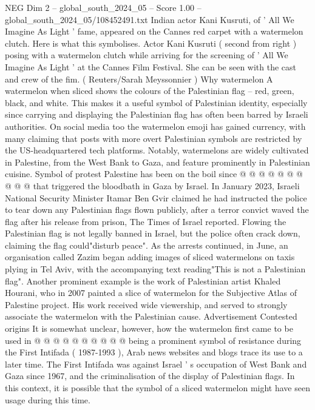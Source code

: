 \begin{textsample}{NEG Dim 2 – global\_south\_2024\_05 – Score 1.00 – global\_south\_2024\_05/108452491.txt}  \label{ex:f2_neg_375}
Indian actor Kani Kusruti, of ' All We Imagine As Light ' fame, appeared on the Cannes red carpet with a watermelon clutch.
Here is what this symbolises.
Actor Kani Kusruti ( second from right ) posing with a watermelon clutch while arriving for the screening of ' All We Imagine As Light ' at the Cannes Film Festival.
She can be seen with the cast and crew of the fim. ( Reuters/Sarah Meyssonnier ) Why watermelon A watermelon when sliced shows the colours of the Palestinian flag -- red, green, black, and white.
This makes it a useful symbol of Palestinian identity, especially since carrying and displaying the Palestinian flag has often been barred by Israeli authorities.
On social media too the watermelon emoji has gained currency, with many claiming that posts with more overt Palestinian symbols are restricted by the US-headquartered tech platforms.
Notably, watermelons are widely cultivated in Palestine, from the West Bank to Gaza, and feature prominently in Palestinian cuisine.
Symbol of protest Palestine has been on the boil since @ @ @ @ @ @ @ @ @ @ that triggered the bloodbath in Gaza by Israel.
In January 2023, Israeli National Security Minister Itamar Ben Gvir claimed he had instructed the police to tear down any Palestinian flags flown publicly, after a terror convict waved the flag after his release from prison, The Times of Israel reported.
Flowing the Palestinian flag is not legally banned in Israel, but the police often crack down, claiming the flag could"disturb peace".
As the arrests continued, in June, an organisation called Zazim began adding images of sliced watermelons on taxis plying in Tel Aviv, with the accompanying text reading"This is not a Palestinian flag".
Another prominent example is the work of Palestinian artist Khaled Hourani, who in 2007 painted a slice of watermelon for the Subjective Atlas of Palestine project.
His work received wide viewership, and served to strongly associate the watermelon with the Palestinian cause.
Advertisement Contested origins It is somewhat unclear, however, how the watermelon first came to be used in @ @ @ @ @ @ @ @ @ @ being a prominent symbol of resistance during the First Intifada ( 1987-1993 ), Arab news websites and blogs trace its use to a later time.
The First Intifada was against Israel ' s occupation of West Bank and Gaza since 1967, and the criminalisation of the display of Palestinian flags.
In this context, it is possible that the symbol of a sliced watermelon might have seen usage during this time.

\end{textsample}
